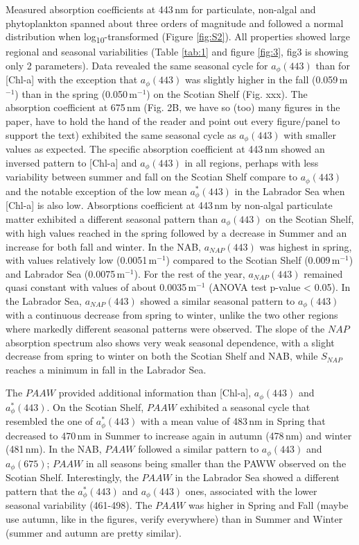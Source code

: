 \documentclass[utf8]{frontiersSCNS} %
\begin{document}
Measured absorption coefficients at 443\,nm for particulate, non-algal and phytoplankton spanned about three orders of magnitude and followed a normal distribution when log\textsubscript{10}-transformed (Figure \ref{fig:S2}). All properties showed large regional and seasonal variabilities (Table \ref{tab:1} and figure \ref{fig:3}, fig3 is showing only 2 parameters). Data revealed the same seasonal cycle for $a_\phi(443)$ than for [Chl-a] with the exception that $a_\phi(443)$ was slightly higher in the fall (0.059\,m$^{-1}$) than in the spring (0.050\,m$^{-1}$) on the Scotian Shelf (Fig. xxx). The absorption coefficient at 675\,nm (Fig. 2B, we have so (too) many figures in the paper, have to hold the hand of the reader and point out every figure/panel to support the text) exhibited the same seasonal cycle as $a_\phi(443)$ with smaller values as expected. The specific absorption coefficient at 443\,nm showed an inversed pattern to [Chl-a] and $a_\phi(443)$ in all regions, perhaps with less variability between summer and fall on the Scotian Shelf compare to $a_\phi(443)$ and the notable exception of the low mean  $a^*_\phi(443)$ in the Labrador Sea when [Chl-a] is also low. Absorptions coefficient at 443\,nm by non-algal particulate matter exhibited a different seasonal pattern than $a_\phi(443)$ on the Scotian Shelf, with high values reached in the spring followed by a decrease in Summer and an increase for both fall and winter. In the NAB, $a_{NAP}(443)$ was highest in spring, with values relatively low (0.0051\,m$^{-1}$) compared to the Scotian Shelf (0.009\,m$^{-1}$) and Labrador Sea (0.0075\,m$^{-1}$).  For the rest of the year,  $a_{NAP}(443)$ remained quasi constant with values of about 0.0035\,m$^{-1}$ (ANOVA test p-value < 0.05). In the Labrador Sea, $a_{NAP}(443)$ showed a similar seasonal pattern to $a_{\phi}(443)$ with a continuous decrease from spring to winter, unlike the two other regions where markedly different seasonal patterns were observed. The slope of the $NAP$ absorption spectrum also shows very weak seasonal dependence, with a slight decrease from spring to winter on both the Scotian Shelf and NAB, while $S_{NAP}$ reaches a minimum in fall in the Labrador Sea. 

The $PAAW$ provided additional information than [Chl-a], $a_\phi(443)$ and $a^*_\phi(443)$. On the Scotian Shelf, $PAAW$ exhibited a seasonal cycle that resembled the one of $a^*_\phi(443)$ with a mean value of  483\,nm in Spring that decreased to 470\,nm in Summer to increase again in autumn (478\,nm) and winter (481\,nm). In the NAB, $PAAW$ followed a similar pattern to $a_\phi(443)$ and  $a_\phi(675)$; $PAAW$ in all seasons being smaller than the PAWW observed on the Scotian Shelf.  Interestingly, the $PAAW$ in the Labrador Sea showed a different pattern that the $a^*_\phi(443)$ and $a_\phi(443)$ ones, associated with the lower seasonal variability (461-498). The $PAAW$ was higher in Spring and Fall (maybe use autumn, like in the figures, verify everywhere) than in Summer and Winter (summer and autumn are pretty similar).
\end{document}
